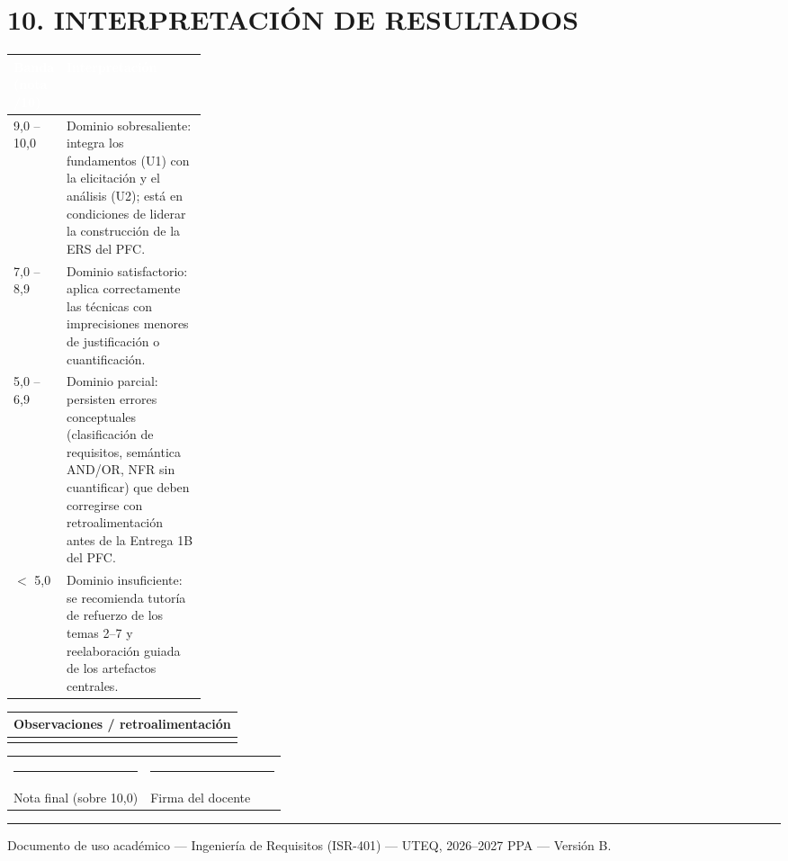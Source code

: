 \documentclass[11pt]{article}
\newcommand{\thdr}[1]{\cellcolor{utegreen}\textcolor{white}{\textbf{#1}}}
\begin{document}
\section*{\textcolor{utegreendk}{10. INTERPRETACIÓN DE RESULTADOS}}

\noindent\begin{tabularx}{\linewidth}{|C{0.25\linewidth}|X|}
\hline
\thdr{Banda (nota /10)} & \thdr{Interpretación}\\
\hline
{}9{,}0 -- 10{,}0 & Dominio sobresaliente: integra los fundamentos (U1) con la elicitación y el análisis (U2); está en condiciones de liderar la construcción de la ERS del PFC.\\
\hline
{}7{,}0 -- 8{,}9 & Dominio satisfactorio: aplica correctamente las técnicas con imprecisiones menores de justificación o cuantificación.\\
\hline
{}5{,}0 -- 6{,}9 & Dominio parcial: persisten errores conceptuales (clasificación de requisitos, semántica AND/OR, NFR sin cuantificar) que deben corregirse con retroalimentación antes de la Entrega 1B del PFC.\\
\hline
{}$<$ 5{,}0 & Dominio insuficiente: se recomienda tutoría de refuerzo de los temas 2--7 y reelaboración guiada de los artefactos centrales.\\
\hline
\end{tabularx}

\vspace{14pt}
\noindent\begin{tabularx}{\linewidth}{|X|}
\hline
\cellcolor{lightblue}\textbf{Observaciones / retroalimentación} \\
\hline
\rule{0pt}{42pt} \\
\hline
\end{tabularx}

\vspace{18pt}
\noindent\begin{tabularx}{\linewidth}{C{0.5\linewidth}C{0.5\linewidth}}
\rule{6cm}{0.4pt} & \rule{6cm}{0.4pt} \\
Nota final (sobre 10{,}0) & Firma del docente \\
\end{tabularx}

\vspace{10pt}
\noindent\textcolor{gold}{\rule{\linewidth}{1.5pt}}
\begin{center}
\footnotesize Documento de uso académico --- Ingeniería de Requisitos (ISR-401) --- UTEQ, 2026--2027 PPA --- Versión B.
\end{center}
\end{document}
